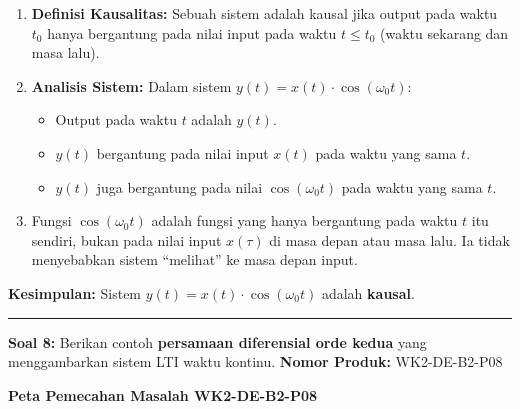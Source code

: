 \documentclass[
  letterpaper,
  DIV=11,
  numbers=noendperiod]{scrreprt}
\providecommand{\tightlist}{%
  \setlength{\itemsep}{0pt}\setlength{\parskip}{0pt}}
\begin{document}
\begin{enumerate}
\def\labelenumi{\arabic{enumi}.}
\tightlist
\item
  \textbf{Definisi Kausalitas:} Sebuah sistem adalah kausal jika output
  pada waktu \(t_0\) hanya bergantung pada nilai input pada waktu
  \(t \le t_0\) (waktu sekarang dan masa lalu).
\item
  \textbf{Analisis Sistem:} Dalam sistem
  \(y(t) = x(t) \cdot \cos(\omega_0 t)\):

  \begin{itemize}
  \tightlist
  \item
    Output pada waktu \(t\) adalah \(y(t)\).
  \item
    \(y(t)\) bergantung pada nilai input \(x(t)\) pada waktu yang sama
    \(t\).
  \item
    \(y(t)\) juga bergantung pada nilai \(\cos(\omega_0 t)\) pada waktu
    yang sama \(t\).
  \end{itemize}
\item
  Fungsi \(\cos(\omega_0 t)\) adalah fungsi yang hanya bergantung pada
  waktu \(t\) itu sendiri, bukan pada nilai input \(x(\tau)\) di masa
  depan atau masa lalu. Ia tidak menyebabkan sistem ``melihat'' ke masa
  depan input.
\end{enumerate}

\textbf{Kesimpulan:} Sistem \(y(t) = x(t) \cdot \cos(\omega_0 t)\)
adalah \textbf{kausal}.

\begin{center}\rule{0.5\linewidth}{0.5pt}\end{center}

\textbf{Soal 8:} Berikan contoh \textbf{persamaan diferensial orde
kedua} yang menggambarkan sistem LTI waktu kontinu. \textbf{Nomor
Produk:} WK2-DE-B2-P08

\textbf{Peta Pemecahan Masalah WK2-DE-B2-P08}
\end{document}
